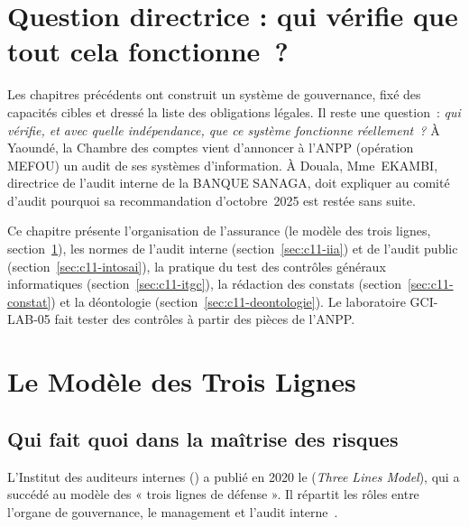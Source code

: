 \bigskip

\section*{Question directrice : qui vérifie que tout cela fonctionne~?}

Les chapitres précédents ont construit un système de gouvernance, fixé des
capacités cibles et dressé la liste des obligations légales. Il reste une
question~: \emph{qui vérifie, et avec quelle indépendance, que ce système
fonctionne réellement~?} À Yaoundé, la Chambre des comptes vient d'annoncer
à l'ANPP (opération MEFOU) un audit de ses systèmes d'information. À
Douala, Mme~EKAMBI, directrice de l'audit interne de la BANQUE SANAGA, doit
expliquer au comité d'audit pourquoi sa recommandation d'octobre~2025 est
restée sans suite.

Ce chapitre présente l'organisation de l'assurance (le modèle des trois
lignes, section~\ref{sec:c11-trois-lignes}), les normes de l'audit interne
(section~\ref{sec:c11-iia}) et de l'audit public
(section~\ref{sec:c11-intosai}), la pratique du test des contrôles
généraux informatiques (section~\ref{sec:c11-itgc}), la rédaction des
constats (section~\ref{sec:c11-constat}) et la déontologie
(section~\ref{sec:c11-deontologie}). Le laboratoire GCI-LAB-05 fait tester des
contrôles à partir des pièces de l'ANPP.

\separateur

\section{Le Modèle des Trois Lignes}
\label{sec:c11-trois-lignes}

\subsection{Qui fait quoi dans la maîtrise des risques}

L'Institut des auditeurs internes () a publié en 2020 le
(\textit{Three Lines Model}), qui a succédé au modèle des « trois lignes de
défense ». Il répartit les rôles entre l'organe de gouvernance, le
management et l'audit interne~\cite{iia2020troislignes}.

